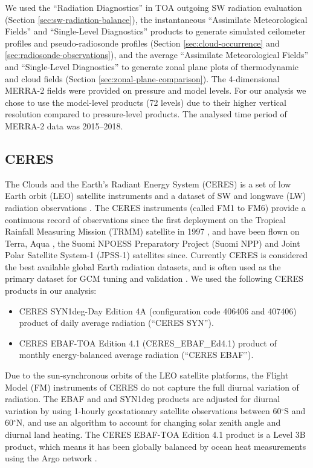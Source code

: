 We used the ``Radiation Diagnostics'' in TOA outgoing SW radiation evaluation (Section
\ref{sec:sw-radiation-balance}), the instantaneous ``Assimilate Meteorological
Fields'' and ``Single-Level Diagnostics'' products to generate simulated
ceilometer profiles and pseudo-radiosonde profiles (Section
\ref{sec:cloud-occurrence} and \ref{sec:radiosonde-observations}), and the
average ``Assimilate Meteorological Fields'' and ``Single-Level Diagnostics'' to
generate zonal plane plots of thermodynamic and cloud fields (Section
\ref{sec:zonal-plane-comparison}). The 4-dimensional MERRA-2 fields were
provided on pressure and model levels. For our analysis we chose to use the
model-level products (72 levels) due to their higher vertical resolution
compared to pressure-level products. The analysed time period of MERRA-2 data
was 2015--2018.

\subsection{CERES}

The Clouds and the Earth's Radiant Energy System (CERES) is a set of low Earth
orbit (LEO) satellite instruments and a dataset of SW and longwave (LW)
radiation observations \citep{loeb2018,doelling2016}. The CERES instruments
(called FM1 to FM6) provide a continuous record of observations since the first
deployment on the Tropical Rainfall Measuring Mission (TRMM) satellite in 1997
\citep{simpson1996}, and have been flown on Terra, Aqua \citep{parkinson2003},
the Suomi NPOESS Preparatory Project (Suomi NPP) and Joint Polar Satellite
System-1 (JPSS-1) \citep{goldberg2013} satellites since. Currently CERES is
considered the best available global Earth radiation datasets, and is often used
as the primary dataset for GCM tuning and validation
\citep{schmidt2017,hourdin2017}. We used the following CERES products in our
analysis:

\begin{itemize}
\item CERES SYN1deg-Day Edition 4A (configuration code 406406 and 407406)
product of daily average radiation (``CERES SYN'').
\item CERES EBAF-TOA Edition 4.1 (CERES\_EBAF\_Ed4.1)
product of monthly energy-balanced average radiation (``CERES EBAF'').
\end{itemize}

Due to the sun-synchronous orbits of the LEO satellite platforms, the Flight
Model (FM) instruments of CERES do not capture the full diurnal variation of
radiation. The EBAF and and SYN1deg products are adjusted for diurnal variation
by using 1-hourly geostationary satellite observations between 60$^\circ$S and
60$^\circ$N, and use an algorithm to account for changing solar zenith angle and
diurnal land heating. The CERES EBAF-TOA Edition 4.1 product is a Level 3B
product, which means it has been globally balanced by ocean heat measurements
using the Argo network \citep{roemmich2009}.


